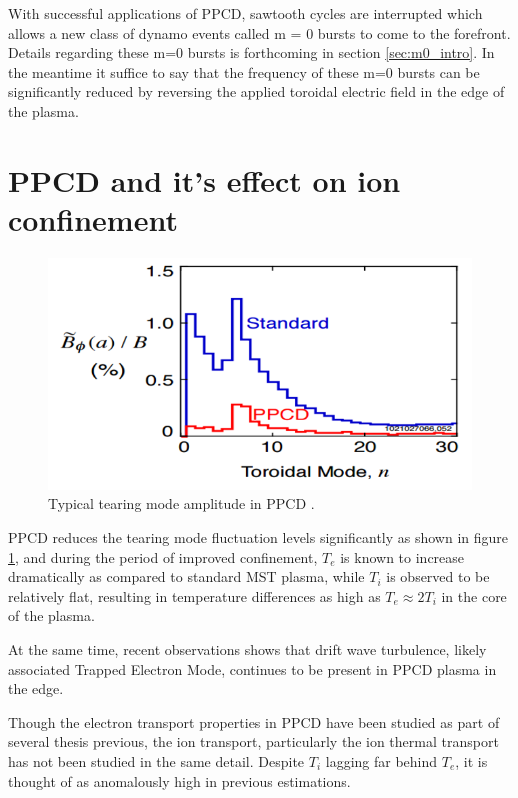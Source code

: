 \begin{refsection}
With successful applications of PPCD, sawtooth cycles are interrupted which allows a new class of dynamo events called m = 0 bursts to come to the forefront. Details regarding these m=0 bursts is forthcoming in section \ref{sec:m0_intro}. In the meantime it suffice to say that the frequency of these m=0 bursts can be significantly reduced by reversing the applied toroidal electric field in the edge of the plasma\cite{Chapman2001}.

\section{PPCD and it's effect on ion confinement} \label{sec:PPCD_characteristic}

\begin{figure}
    \centering
    \includegraphics{./1_Introduction/ppcd_fluc.png}
    \caption[Typical tearing mode amplitude in PPCD]{Typical tearing mode amplitude in PPCD .}
    \label{fig:ppcd_fluc}
\end{figure}

PPCD reduces the tearing mode fluctuation levels significantly as shown in figure \ref{fig:ppcd_fluc}, and during the period of improved confinement, $T_e$ is known to increase dramatically as compared to standard MST plasma, while $T_i$ is observed to be relatively flat, resulting in temperature differences as high as $T_e \approx 2T_i$ in the core of the plasma. 


At the same time, recent observations shows that drift wave turbulence, likely associated Trapped Electron Mode, continues to be present in PPCD plasma in the edge. 

Though the electron transport properties in PPCD have been studied as part of several thesis previous, the ion transport, particularly the ion thermal transport has not been studied in the same detail. Despite $T_i$ lagging far behind $T_e$, it is thought of as anomalously high in previous estimations. 




\end{refsection}
